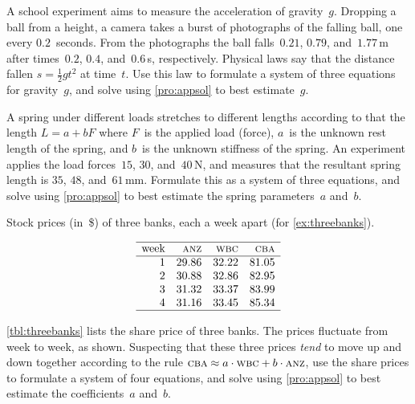 \begin{exercise}  
A school experiment aims to measure the acceleration of gravity~\(g\).
Dropping a ball from a height, a camera takes a burst of photographs of the falling ball, one every \(0.2\)~seconds.
From the photographs the ball falls~\(0.21\), \(0.79\), and~\(1.77\)\,m after times~\(0.2\), \(0.4\), and~\(0.6\)\,s, respectively.
Physical laws say that the distance fallen \(s=\tfrac12gt^2\) at time~\(t\).
Use this law to formulate a system of three equations for gravity~\(g\), and solve using \cref{pro:appsol} to best estimate~\(g\).
\end{exercise}


\begin{exercise}  
A spring under different loads stretches to different lengths according to  that the length \(L=a+bF\) where \(F\)~is the applied load (force), \(a\)~is the unknown rest length of the spring, and \(b\)~is the unknown stiffness of the spring.
An experiment applies the load forces~\(15\), \(30\), and~\(40\)\,N, and measures that the resultant spring length is \(35\), \(48\), and~\(61\)\,mm.
Formulate this as a system of three equations, and solve using \cref{pro:appsol} to best estimate the spring parameters~\(a\) and~\(b\).
\end{exercise}


\begin{exercise}  \label{ex:threebanks}
\begin{table}
\caption{Stock prices (in~\$) of three banks, each a week apart (for \cref{ex:threebanks}).}
\label{tbl:threebanks}
\begin{equation*}
\begin{array}{rrrr}
\hline
\text{week}&\textsc{anz}&\textsc{wbc}&\textsc{cba}
\\\hline
1&29.86&32.22&81.05\\
2&30.88&32.86&82.95\\
3&31.32&33.37&83.99\\
4&31.16&33.45&85.34\\
\hline
\end{array}
\end{equation*}
\end{table}
\cref{tbl:threebanks} lists the share price of three banks. 
The prices fluctuate from week to week, as shown.
Suspecting that these three prices \emph{tend} to move up and down together according to the rule \(\textsc{cba}\approx a\cdot\textsc{wbc}+b\cdot\textsc{anz}\), use the share prices to formulate a system of four equations, and solve using \cref{pro:appsol} to best estimate the coefficients~\(a\) and~\(b\).
\end{exercise}





